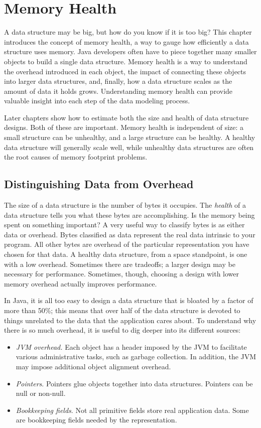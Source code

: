 
\chapter{Memory Health}

A data structure may be big, but how do you know if it is too big? This chapter introduces the concept of memory health, a way to gauge how efficiently a data structure uses memory. Java developers often have to piece together many smaller objects to build a single data structure. Memory health is a way to understand the overhead introduced in each object, the impact of connecting these objects into larger data structures, and, finally, how a data structure scales as the amount of data it holds grows. Understanding memory health can provide valuable insight into each step of the data modeling process.

Later chapters show how to estimate both the size and health of data structure designs. Both of these are important. Memory health is independent of size: a small structure can be unhealthy, and a large structure can be healthy. A healthy data structure will generally scale well, while unhealthy data structures are often the root causes of memory footprint problems. 


\section{Distinguishing Data from Overhead}

The size of a data structure is the number of bytes it occupies. The \emph{health} of a data structure tells you what these bytes are accomplishing. Is the memory being spent on something important?  A very useful way to classify bytes is as either data or overhead. Bytes classified as data represent the real data intrinsic to your program. All other bytes are overhead of the particular representation you have chosen for that data. A healthy data structure, from a space standpoint, is one with a low overhead.  Sometimes there are tradeoffs; a larger design may be necessary for performance. Sometimes, though, choosing a design with lower memory overhead actually improves performance.

In Java, it is all too easy to design a data structure that is bloated by a factor of more than 50\%; this means that over half of the data structure is devoted to things unrelated to the data that the application cares about. To understand why there is so much overhead, it is useful to dig deeper into its different sources:  
\begin{itemize}
\item \emph{JVM overhead.} Each object has a header imposed by the JVM to facilitate various administrative tasks, such as garbage collection. In addition, the JVM may impose additional object alignment overhead.
\item \emph{Pointers}. Pointers glue objects together into data structures. Pointers can be null or non-null.   
\item \emph{Bookkeeping fields}. Not all primitive fields store real application data. Some are bookkeeping fields needed by the representation. 
\end{itemize}


